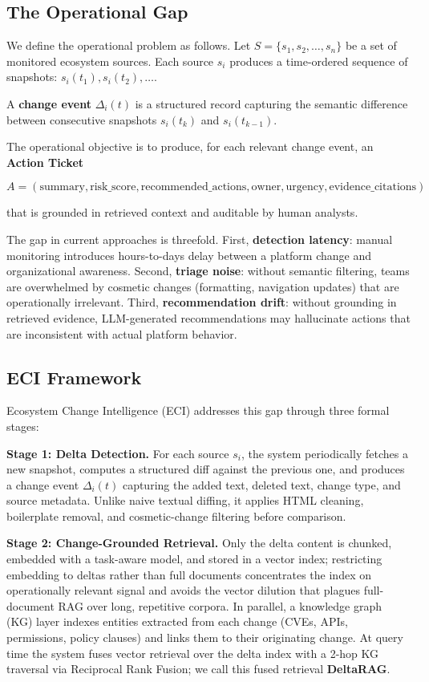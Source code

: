 \documentclass[
]{article}
\begin{document}
\subsection{The Operational Gap}\label{the-operational-gap}

We define the operational problem as follows. Let
$S = \{s_1, s_2, \ldots, s_n\}$
be a set of monitored ecosystem sources. Each source $s_i$ produces a
time-ordered sequence of snapshots:
$s_i(t_1), s_i(t_2), \ldots$.

A \textbf{change event} $\Delta_i(t)$ is a structured record capturing the
semantic difference between consecutive snapshots
$s_i(t_k)$ and $s_i(t_{k-1})$.

The operational objective is to produce, for each relevant change event,
an \textbf{Action Ticket}

\[
A = (\text{summary}, \text{risk\_score},
\text{recommended\_actions}, \text{owner},
\text{urgency}, \text{evidence\_citations})
\]

that is grounded in retrieved context and auditable by human analysts.

The gap in current approaches is threefold. First, \textbf{detection
latency}: manual monitoring introduces hours-to-days delay between a
platform change and organizational awareness. Second, \textbf{triage
noise}: without semantic filtering, teams are overwhelmed by cosmetic
changes (formatting, navigation updates) that are operationally
irrelevant. Third, \textbf{recommendation drift}: without grounding in
retrieved evidence, LLM-generated recommendations may hallucinate
actions that are inconsistent with actual platform behavior.

\subsection{ECI Framework}\label{eci-framework}

Ecosystem Change Intelligence (ECI) addresses this gap through three
formal stages:

\textbf{Stage 1: Delta Detection.} For each source $s_i$, the system
periodically fetches a new snapshot, computes a structured diff against
the previous one, and produces a change event $\Delta_i(t)$ capturing the
added text, deleted text, change type, and source metadata. Unlike naive
textual diffing, it applies HTML cleaning, boilerplate removal, and
cosmetic-change filtering before comparison.

\textbf{Stage 2: Change-Grounded Retrieval.} Only the delta content is
chunked, embedded with a task-aware model, and stored in a vector index;
restricting embedding to deltas rather than full documents concentrates
the index on operationally relevant signal and avoids the vector dilution
that plagues full-document RAG over long, repetitive corpora. In parallel,
a knowledge graph (KG) layer indexes entities extracted from each change
(CVEs, APIs, permissions, policy clauses) and links them to their
originating change. At query time the system fuses vector retrieval over
the delta index with a 2-hop KG traversal via Reciprocal Rank Fusion; we
call this fused retrieval \textbf{DeltaRAG}.
\end{document}
